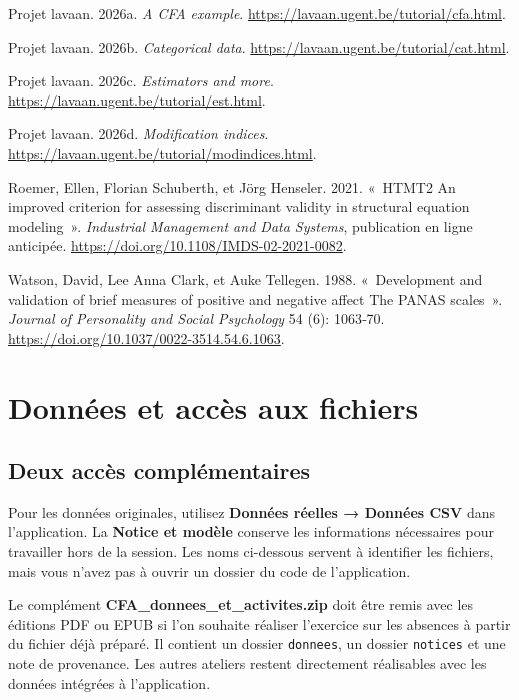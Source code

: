 \documentclass[
  french,
  11pt,
  a4paper,
  DIV=11,
  numbers=noendperiod]{scrreprt}
\newlength{\cslhangindent}
\newenvironment{CSLReferences}[2] %
 {\begin{list}{}{%
  \setlength{\itemindent}{0pt}
  \setlength{\leftmargin}{0pt}
  \setlength{\parsep}{0pt}
  \ifodd #1
   \setlength{\leftmargin}{\cslhangindent}
   \setlength{\itemindent}{-1\cslhangindent}
  \fi
  \setlength{\itemsep}{#2\baselineskip}}}
 {\end{list}}
\begin{document}
\begin{CSLReferences}{1}{1}
Projet lavaan. 2026a. \emph{A CFA example}.
\url{https://lavaan.ugent.be/tutorial/cfa.html}.

Projet lavaan. 2026b. \emph{Categorical data}.
\url{https://lavaan.ugent.be/tutorial/cat.html}.

Projet lavaan. 2026c. \emph{Estimators and more}.
\url{https://lavaan.ugent.be/tutorial/est.html}.

Projet lavaan. 2026d. \emph{Modification indices}.
\url{https://lavaan.ugent.be/tutorial/modindices.html}.

Roemer, Ellen, Florian Schuberth, et Jörg Henseler. 2021. {«~HTMT2 An
improved criterion for assessing discriminant validity in structural
equation modeling~»}. \emph{Industrial Management and Data Systems},
publication en ligne anticipée.
\url{https://doi.org/10.1108/IMDS-02-2021-0082}.

Watson, David, Lee Anna Clark, et Auke Tellegen. 1988. {«~Development
and validation of brief measures of positive and negative affect The
PANAS scales~»}. \emph{Journal of Personality and Social Psychology} 54
(6): 1063‑70. \url{https://doi.org/10.1037/0022-3514.54.6.1063}.

\end{CSLReferences}

\cleardoublepage
{}
{}
\appendix

\chapter{Données et accès aux fichiers}\label{sec-donnees}

\section{Deux accès
complémentaires}\label{deux-accuxe8s-compluxe9mentaires}

Pour les données originales, utilisez \textbf{Données réelles → Données
CSV} dans l'application. La \textbf{Notice et modèle} conserve les
informations nécessaires pour travailler hors de la session. Les noms
ci-dessous servent à identifier les fichiers, mais vous n'avez pas à
ouvrir un dossier du code de l'application.

Le complément \textbf{CFA\_donnees\_et\_activites.zip} doit être remis
avec les éditions PDF ou EPUB si l'on souhaite réaliser l'exercice sur
les absences à partir du fichier déjà préparé. Il contient un dossier
\texttt{donnees}, un dossier \texttt{notices} et une note de provenance.
Les autres ateliers restent directement réalisables avec les données
intégrées à l'application.
\end{document}
